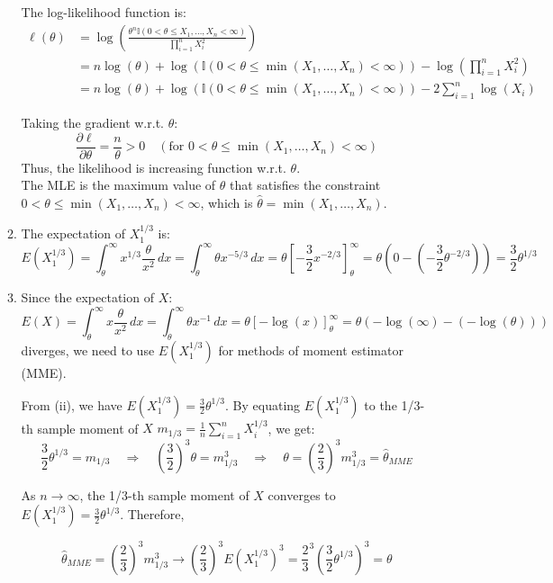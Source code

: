 \documentclass{article}
\begin{document}
\begin{enumerate}
\begin{enumerate}[label=(\roman*)]
    The log-likelihood function is:
    \begin{align*}
    \ell(\theta) &= \log(\frac{\theta^n \mathbb{I} (0 < \theta \leq X_1, \dots, X_n < \infty)}{\prod_{i=1}^{n} X_i^2 }) \\
    &= n \log(\theta) + \log(\mathbb{I} (0 < \theta \leq \min(X_1, \dots, X_n) < \infty)) - \log(\prod_{i=1}^{n} X_i^2) \\
    &= n \log(\theta) + \log(\mathbb{I} (0 < \theta \leq \min(X_1, \dots, X_n) < \infty)) - 2 \sum_{i=1}^{n} \log(X_i)
    \end{align*}

    Taking the gradient w.r.t. $\theta$:
    \[
    \frac{\partial \ell}{\partial \theta} = \frac{n}{\theta} > 0 \quad (\text{for } 0 < \theta \leq \min(X_1, \dots, X_n) < \infty)
    \]
    Thus, the likelihood is increasing function w.r.t. $\theta$. \\
    The MLE is the maximum value of $\theta$ that satisfies the constraint $0 < \theta \leq \min(X_1, \dots, X_n) < \infty$, which is $\hat{\theta} = \min(X_1, \dots, X_n)$.

    \item The expectation of $X_1^{1/3}$ is:
    \[
    E(X_1^{1/3}) = \int_{\theta}^{\infty} x^{1/3} \frac{\theta}{x^2} \, dx = \int_{\theta}^{\infty} \theta x^{-5/3} \, dx = \theta \left[ -\frac{3}{2} x^{-2/3} \right]_{\theta}^{\infty} = \theta (0 - (-\frac{3}{2} \theta^{-2/3})) = \frac{3}{2} \theta^{1/3}
    \]

    \item
    Since the expectation of $X$:
    \[
    E(X) = \int_{\theta}^{\infty} x \frac{\theta}{x^2} \, dx = \int_{\theta}^{\infty} \theta x^{-1} \, dx = \theta \left[ -\log(x) \right]_{\theta}^{\infty} = \theta (-\log(\infty) - (-\log(\theta)))
    \]
    diverges, we need to use $E(X_1^{1/3})$ for methods of moment estimator (MME).

    From (ii), we have $E(X_1^{1/3}) = \frac{3}{2} \theta^{1/3}$.
    By equating $E(X_1^{1/3})$ to the 1/3-th sample moment of $X$ $m_{1/3} = \frac{1}{n} \sum_{i=1}^{n} X_i^{1/3}$, we get:
    \[
    \frac{3}{2} \theta^{1/3} = m_{1/3} \quad \Rightarrow \quad (\frac{3}{2})^{3} \theta = m_{1/3}^3 \quad \Rightarrow \quad \theta = (\frac{2}{3})^{3} m_{1/3}^3 = \hat{\theta}_{MME}
    \]

    As $n \to \infty$, the 1/3-th sample moment of $X$ converges to $E(X_1^{1/3}) = \frac{3}{2} \theta^{1/3}$. Therefore,

    \[
    \hat{\theta}_{MME} = (\frac{2}{3})^{3} m_{1/3}^3 \to (\frac{2}{3})^{3} E(X_1^{1/3})^3 = \frac{2}{3}^3 (\frac{3}{2} \theta^{1/3})^3 = \theta
    \]


\end{enumerate}
\end{enumerate}
\end{document}
